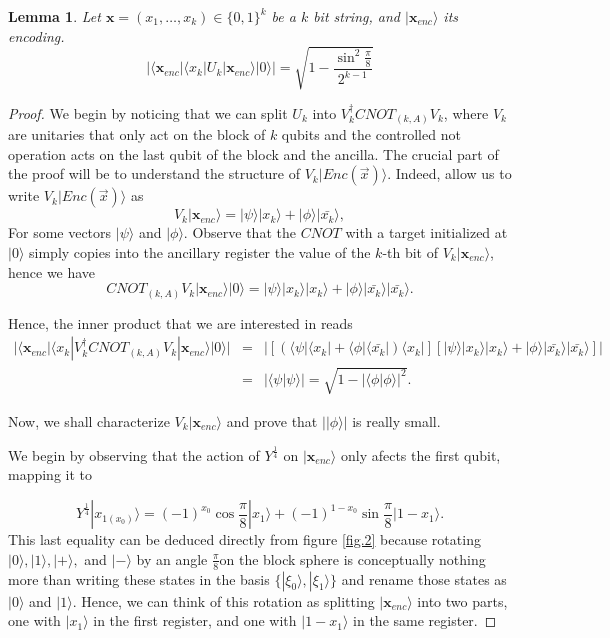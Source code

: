 \documentclass{article}
\newtheorem{lemma}[theorem]{Lemma}
\theoremstyle{definition}
\newcommand{\ket}[1]{|#1\rangle}
\newcommand{\bra}[1]{\langle#1|}
\newcommand{\braket}[2]{\langle{#1}|{#2}\rangle}
\begin{document}
\begin{lemma}
Let $\textbf{x}=(x_1,\dots,x_k)\in\{0,1\}^k$ be a $k$ bit string, and $\ket{\textbf{x}_{enc}}$ its encoding.
\begin{equation}
|\bra{\textbf{x}_{enc}}\bra{x_k}U_k\ket{\textbf{x}_{enc}}\ket{0}|= \sqrt{1-\frac{\sin^2\frac{\pi}{8}}{2^{k-1}}}
\end{equation}
\end{lemma}
\begin{proof}
We begin by noticing that we can split $U_k$ into $V_k^\dagger CNOT_{(k,A)}V_k$, where $V_k$ are unitaries that only act on the block of $k$ qubits and the controlled not operation acts on the last qubit of the block and the ancilla. The crucial part of the proof will be to understand the structure of  $V_k\ket{Enc(\vec{x})}$. Indeed, allow us to write  $V_k\ket{Enc(\vec{x})}$ as
\[V_k\ket{\textbf{x}_{enc}}=\ket{\psi}\ket{x_k}+\ket{\phi}\ket{\bar{x_k}},\]
For some vectors $\ket{\psi}$ and $\ket{\phi}$. Observe that the $CNOT$ with a target initialized at $\ket{0}$ simply copies into the ancillary register the value of the $k$-th bit of $V_k\ket{\textbf{x}_{enc}}$, hence we have
\begin{equation}
CNOT_{(k,A)}V_k\ket{\textbf{x}_{enc}}\ket{0}=\ket{\psi}\ket{x_k}\ket{x_k}+\ket{\phi}\ket{\bar{x_k}}\ket{\bar{x_k}}.
\end{equation}

Hence, the inner product that we are interested in reads
\begin{eqnarray}
|\bra{\textbf{x}_{enc}}\bra{x_k}V_k^\dagger CNOT_{(k,A)}V_k\ket{\textbf{x}_{enc}}\ket{0}|&=&|\left[\left(\bra{\psi}\bra{x_k}+\bra{\phi}\bra{\bar{x_k}}\right)\bra{x_k}\right]\left[\ket{\psi}\ket{x_k}\ket{x_k}+\ket{\phi}\ket{\bar{x_k}}\ket{\bar{x_k}}\right]|\\
&=&|\braket{\psi}{\psi}|=\sqrt{1-|\braket{\phi}{\phi}|^2}.
\end{eqnarray}

Now, we shall characterize $V_k\ket{\textbf{x}_{enc}}$ and prove that $|\ket{\phi}|$ is really small.

We begin by observing that the action of $Y^{\frac{1}{4}}$ on $\ket{\textbf{x}_{enc}}$ only afects the first qubit, mapping it to

\[Y^\frac{1}{4}\ket{x_{1(x_0)}}=(-1)^{x_0}\cos\frac{\pi}{8}\ket{x_1}+(-1)^{1-x_0}\sin\frac{\pi}{8}\ket{1-x_1}.\]
This last equality can be deduced directly from figure \ref{fig.2} because rotating $\ket{0}, \ket{1}, \ket{+},$ and $\ket{-}$ by an angle $\frac{\pi}{8}$on the block sphere is conceptually nothing more than writing these states in the basis $\{\ket{\xi_0}, \ket{\xi_1}\}$ and rename those states as $\ket{0}$ and $\ket{1}$. Hence, we can think of this rotation as splitting $\ket{\textbf{x}_{enc}}$ into two parts, one with $\ket{x_1}$ in the first register, and one with $\ket{1-x_1}$ in the same register.


\end{proof}
\end{document}
